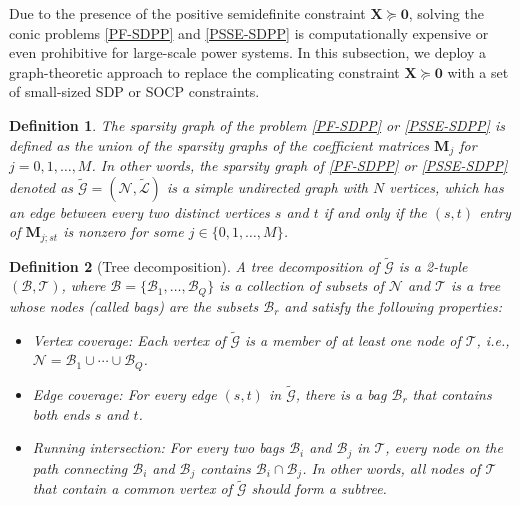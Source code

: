 \documentclass[journal,twoside]{IEEEtran}
\newtheorem{definition}{Definition}
\newcommand{\bX}{\mathbf{X}}
\newcommand{\cB}{{\mathcal B}}
\newcommand{\cG}{{\mathcal G}}
\newcommand{\cN}{{\mathcal N}}
\newcommand{\cT}{{\mathcal T}}
\begin{document}
Due to the presence of the positive semidefinite constraint $\bX \succeq \mathbf{0}$,
 solving the  conic problems \eqref{PF-SDPP} and \eqref{PSSE-SDPP} is computationally expensive or
even prohibitive for large-scale power systems.
In this subsection, we deploy  a graph-theoretic approach  to replace
the complicating constraint $\bX \succeq \mathbf{0}$
with a set of small-sized SDP or SOCP constraints.

\begin{definition}
The sparsity graph of the problem \eqref{PF-SDPP} or \eqref{PSSE-SDPP} is defined as the
union of the sparsity graphs of the coefficient matrices $\mathbf{M}_j$ for $j = 0,1,\ldots,M$.
In other words, the sparsity graph of \eqref{PF-SDPP}  or \eqref{PSSE-SDPP} denoted as $\tilde{\mathcal G}=(\mathcal N,\tilde{\mathcal L})$
is a simple undirected graph with $N$ vertices,
which has an edge between every two  distinct vertices $s$ and $t$ if and only if
the $(s,t)$ entry of $\mathbf{M}_{j;st}$ is nonzero for some $j \in \{0,1,\ldots,M\}$.
\end{definition}

\begin{definition}[Tree decomposition]
A tree decomposition of $\tilde{\mathcal G}$ is a 2-tuple $(\cB, \cT)$,
where $\cB = \{\cB_1,\ldots,\cB_Q\}$ is a collection of subsets of $\cN$ and $\cT$ is a tree whose nodes (called \emph{bags}) are the subsets $\cB_r$ and satisfy the following properties:
\begin{itemize}
  \item Vertex coverage: Each vertex of $\tilde{\mathcal G}$ is a member of at least one node of $\cT$, i.e., $\cN = \cB_1 \cup \cdots \cup \cB_Q$.
  \item Edge coverage: For every edge $(s, t)$ in $\tilde{\mathcal G}$, there is a bag $\cB_r$ that contains both ends $s$ and $t$.
  \item Running intersection: For every two bags $\cB_i$ and $\cB_j$ in $\cT$, every node on the path connecting $\cB_i$ and $\cB_j$ contains $\cB_i \cap \cB_j$.
      In other words, all nodes of $\cT$ that contain a common vertex of $\tilde{\mathcal G}$ should form a subtree.
\end{itemize}
\end{definition}
\end{document}
